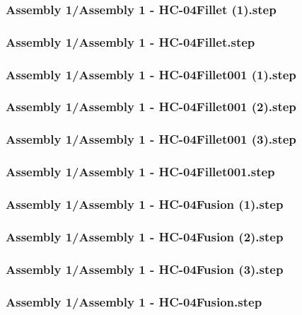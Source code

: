 \documentclass[a4paper,12pt]{article}
\begin{document}
\subsubsection{Assembly 1/Assembly 1 - HC-04Fillet (1).step}

\subsubsection{Assembly 1/Assembly 1 - HC-04Fillet.step}

\subsubsection{Assembly 1/Assembly 1 - HC-04Fillet001 (1).step}

\subsubsection{Assembly 1/Assembly 1 - HC-04Fillet001 (2).step}

\subsubsection{Assembly 1/Assembly 1 - HC-04Fillet001 (3).step}

\subsubsection{Assembly 1/Assembly 1 - HC-04Fillet001.step}

\subsubsection{Assembly 1/Assembly 1 - HC-04Fusion (1).step}

\subsubsection{Assembly 1/Assembly 1 - HC-04Fusion (2).step}

\subsubsection{Assembly 1/Assembly 1 - HC-04Fusion (3).step}

\subsubsection{Assembly 1/Assembly 1 - HC-04Fusion.step}

\end{document}
